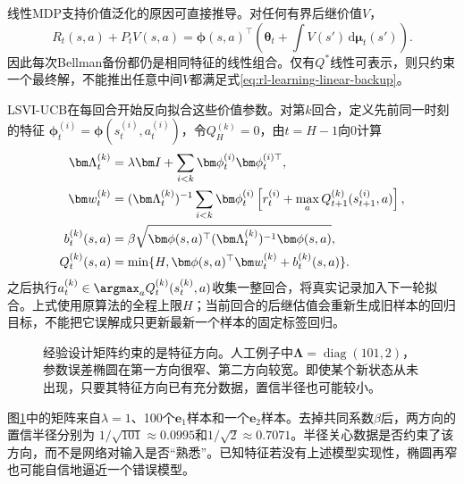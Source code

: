 线性MDP支持价值泛化的原因可直接推导。对任何有界后继价值$V$，
\begin{equation}
 R_t(s,a)+P_tV(s,a)
   =\bm\phi(s,a)^\top
       \left(\bm\theta_t+\int V(s')\,\mathrm d\bm\mu_t(s')\right).
 \label{eq:rl-learning-linear-backup}
\end{equation}
因此每次Bellman备份都仍是相同特征的线性组合。仅有$Q^*$线性可表示，则只约束一个最终解，不能推出任意中间$V$都满足式\eqref{eq:rl-learning-linear-backup}。

LSVI-UCB在每回合开始反向拟合这些价值参数。对第$k$回合，定义先前同一时刻的特征
$\bm\phi_t^{(i)}=\bm\phi(s_t^{(i)},a_t^{(i)})$，令$Q_H^{(k)}=0$，由$t=H-1$向0计算
\begin{align}
 \bm\Lambda_t^{(k)}
   &=\lambda\bm I+\sum_{i<k}
                         \bm\phi_t^{(i)}\bm\phi_t^{(i)\top},\notag\\
 \bm w_t^{(k)}
   &=(\bm\Lambda_t^{(k)})^{-1}
       \sum_{i<k}\bm\phi_t^{(i)}
       \left[r_t^{(i)}
             +\max_aQ_{t+1}^{(k)}(s_{t+1}^{(i)},a)\right],\notag\\
 b_t^{(k)}(s,a)
   &=\beta\sqrt{\bm\phi(s,a)^\top
                     (\bm\Lambda_t^{(k)})^{-1}\bm\phi(s,a)},\notag\\
 Q_t^{(k)}(s,a)
   &=\min\{H,\bm\phi(s,a)^\top\bm w_t^{(k)}
                                       +b_t^{(k)}(s,a)\}.
 \label{eq:rl-learning-lsvi}
\end{align}
之后执行$a_t^{(k)}\in\argmax_aQ_t^{(k)}(s_t^{(k)},a)$收集一整回合，将真实记录加入下一轮拟合。上式使用原算法的全程上限$H$；当前回合的后继估值会重新生成旧样本的回归目标，不能把它误解成只更新最新一个样本的固定标签回归。

\begin{figure}[t]
  \centering
  
  \caption{经验设计矩阵约束的是特征方向。人工例子中$\bm\Lambda=\operatorname{diag}(101,2)$，参数误差椭圆在第一方向很窄、第二方向较宽。即使某个新状态从未出现，只要其特征方向已有充分数据，置信半径也可能较小。}
  \label{fig:rl-learning-linear-design}
\end{figure}

图\ref{fig:rl-learning-linear-design}中的矩阵来自$\lambda=1$、100个$\bm e_1$样本和一个$\bm e_2$样本。去掉共同系数$\beta$后，两方向的置信半径分别为
$1/\sqrt{101}\approx0.0995$和$1/\sqrt2\approx0.7071$。半径关心数据是否约束了该方向，而不是网络对输入是否“熟悉”。已知特征若没有上述模型实现性，椭圆再窄也可能自信地逼近一个错误模型。

